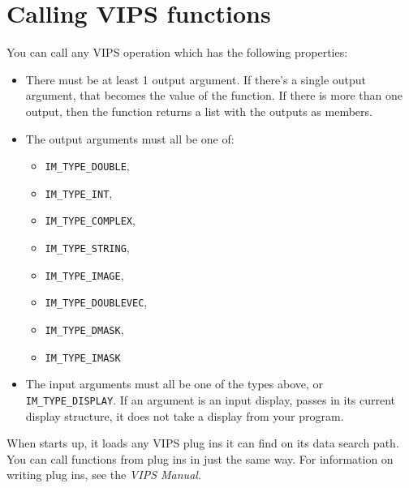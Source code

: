 \section{Calling VIPS functions}

You can call any VIPS operation which has the following properties:

\begin{itemize}

\item
There must be at least 1 output argument. If there's a single output argument,
that becomes the value of the function. If there is more than one output, then
the function returns a list with the outputs as members.

\item
The output arguments must all be one of:

\begin{itemize}
\item \verb+IM_TYPE_DOUBLE+, 
\item \verb+IM_TYPE_INT+, 
\item \verb+IM_TYPE_COMPLEX+, 
\item \verb+IM_TYPE_STRING+, 
\item \verb+IM_TYPE_IMAGE+, 
\item \verb+IM_TYPE_DOUBLEVEC+, 
\item \verb+IM_TYPE_DMASK+, 
\item \verb+IM_TYPE_IMASK+
\end{itemize}

\item
The input arguments must all be one of the types above, or
\verb+IM_TYPE_DISPLAY+. If an argument is an input display, \nip{} passes in
its current display structure, it does not take a display from your program.

\end{itemize}

When \nip{} starts up, it loads any VIPS plug ins it can find on its data
search path. You can call functions from plug ins in just the same way. For
information on writing plug ins, see the \emph{VIPS Manual}.

